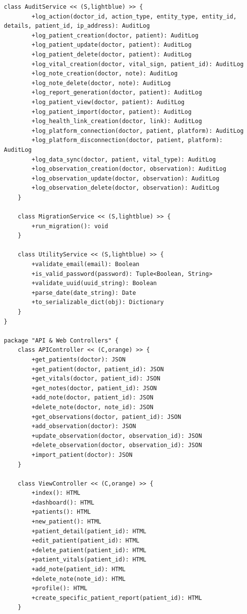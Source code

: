 \documentclass[12pt,a4paper,oneside]{report}
\begin{document}
\begin{lstlisting}[basicstyle=\small\ttfamily, breaklines=true]
    class AuditService << (S,lightblue) >> {
        +log_action(doctor_id, action_type, entity_type, entity_id, details, patient_id, ip_address): AuditLog
        +log_patient_creation(doctor, patient): AuditLog
        +log_patient_update(doctor, patient): AuditLog
        +log_patient_delete(doctor, patient): AuditLog
        +log_vital_creation(doctor, vital_sign, patient_id): AuditLog
        +log_note_creation(doctor, note): AuditLog
        +log_note_delete(doctor, note): AuditLog
        +log_report_generation(doctor, patient): AuditLog
        +log_patient_view(doctor, patient): AuditLog
        +log_patient_import(doctor, patient): AuditLog
        +log_health_link_creation(doctor, link): AuditLog
        +log_platform_connection(doctor, patient, platform): AuditLog
        +log_platform_disconnection(doctor, patient, platform): AuditLog
        +log_data_sync(doctor, patient, vital_type): AuditLog
        +log_observation_creation(doctor, observation): AuditLog
        +log_observation_update(doctor, observation): AuditLog
        +log_observation_delete(doctor, observation): AuditLog
    }
    
    class MigrationService << (S,lightblue) >> {
        +run_migration(): void
    }
    
    class UtilityService << (S,lightblue) >> {
        +validate_email(email): Boolean
        +is_valid_password(password): Tuple<Boolean, String>
        +validate_uuid(uuid_string): Boolean
        +parse_date(date_string): Date
        +to_serializable_dict(obj): Dictionary
    }
}

package "API & Web Controllers" {
    class APIController << (C,orange) >> {
        +get_patients(doctor): JSON
        +get_patient(doctor, patient_id): JSON
        +get_vitals(doctor, patient_id): JSON
        +get_notes(doctor, patient_id): JSON
        +add_note(doctor, patient_id): JSON
        +delete_note(doctor, note_id): JSON
        +get_observations(doctor, patient_id): JSON
        +add_observation(doctor): JSON
        +update_observation(doctor, observation_id): JSON
        +delete_observation(doctor, observation_id): JSON
        +import_patient(doctor): JSON
    }
    
    class ViewController << (C,orange) >> {
        +index(): HTML
        +dashboard(): HTML
        +patients(): HTML
        +new_patient(): HTML
        +patient_detail(patient_id): HTML
        +edit_patient(patient_id): HTML
        +delete_patient(patient_id): HTML
        +patient_vitals(patient_id): HTML
        +add_note(patient_id): HTML
        +delete_note(note_id): HTML
        +profile(): HTML
        +create_specific_patient_report(patient_id): HTML
    }
    

\end{lstlisting}
\end{document}
